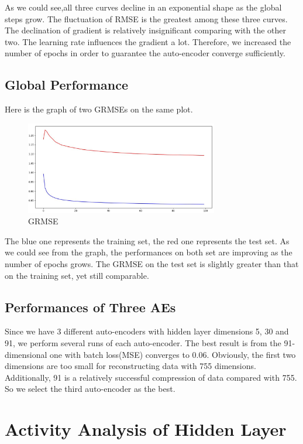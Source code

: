 \documentclass{article}
\begin{document}
  As we could see,all three curves decline in an exponential shape as the global steps grow. The fluctuation of RMSE is the greatest among these three curves. The declination of gradient is relatively insignificant comparing with the other two. The learning rate influences the gradient a lot. Therefore, we increased the number of epochs in order to guarantee the auto-encoder converge sufficiently.
  \subsection{Global Performance}
  Here is the graph of two GRMSEs on the same plot.
  \begin{figure}[H]
  \centering
  \includegraphics[width=0.75\textwidth]{GRMSE.jpg}
  \caption{GRMSE}\label{}
  \end{figure}
  The blue one represents the training set, the red one represents the test set. As we could see from the graph, the performances on both set are improving as the number of epochs grows. The GRMSE on the test set is slightly greater than that on the training set, yet still comparable.
  \subsection{Performances of Three AEs}
  Since we have 3 different auto-encoders with hidden layer dimensions 5, 30 and 91, we perform several runs of each auto-encoder. The best result is from the 91-dimensional one with batch loss(MSE) converges to 0.06. Obviously, the first two dimensions are too small for reconstructing data with 755 dimensions. Additionally, 91 is a relatively successful compression of data compared with 755. So we select the third auto-encoder as the best.
  \section{Activity Analysis of Hidden Layer}
\end{document}
